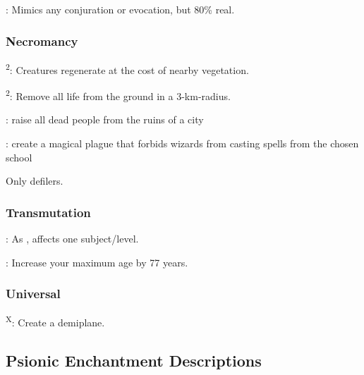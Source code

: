 : Mimics any conjuration or evocation, but 80\% real. %


\subsubsection{Necromancy}
\textsuperscript{2}: Creatures regenerate at the cost of nearby vegetation.

\textsuperscript{2}: Remove all life from the ground in a 3-km-radius. %

: raise all dead people from the ruins of a city

: create a magical plague that forbids wizards from casting spells from the chosen school

 Only defilers.


\subsubsection{Transmutation}
: As , affects one subject/level. %

: Increase your maximum age by 77 years.

\subsubsection{Universal}
\textsuperscript{X}: Create a demiplane. %


\subsection{Psionic Enchantment Descriptions}

